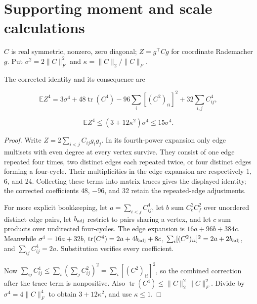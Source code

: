 \section{Supporting moment and scale calculations}\label{sec:technical}
\begin{lemma}\label{thm:T14}
$C$ is real symmetric, nonzero, zero diagonal; $Z=g^\top Cg$ for coordinate Rademacher $g$. Put $\sigma^2=2\|C\|_F^2$ and $\kappa=\|C\|_2/\|C\|_F$.


The corrected identity and its consequence are


\begin{equation}
\mathbb EZ^4=3\sigma^4+48\operatorname{tr}(C^4)
-96\sum_i[(C^2)_{ii}]^2+32\sum_{i,j}C_{ij}^4,
\end{equation}


\begin{equation}
\boxed{\mathbb EZ^4\le(3+12\kappa^2)\sigma^4\le15\sigma^4.}
\end{equation}


\end{lemma}
\begin{proof}
Write $Z=2\sum_{i<j}C_{ij}g_ig_j$. In its fourth-power expansion only edge multisets with even degree at every vertex survive. They consist of one edge repeated four times, two distinct edges each repeated twice, or four distinct edges forming a four-cycle. Their multiplicities in the edge expansion are respectively 1, 6, and 24. Collecting these terms into matrix traces gives the displayed identity; the corrected coefficients 48, $-96$, and 32 retain the repeated-edge adjustments.


For more explicit bookkeeping, let $a=\sum_{i<j}C_{ij}^4$, let $b$ sum $C_e^2C_f^2$ over unordered distinct edge pairs, let $b_{\rm adj}$ restrict to pairs sharing a vertex, and let $c$ sum products over undirected four-cycles. The edge expansion is $16a+96b+384c$. Meanwhile $\sigma^4=16a+32b$, $\operatorname{tr}(C^4)=2a+4b_{\rm adj}+8c$, $\sum_i[(C^2)_{ii}]^2=2a+2b_{\rm adj}$, and $\sum_{ij}C_{ij}^4=2a$. Substitution verifies every coefficient.


Now $\sum_{ij}C_{ij}^4\le\sum_i(\sum_jC_{ij}^2)^2=\sum_i[(C^2)_{ii}]^2$, so the combined correction after the trace term is nonpositive. Also $\operatorname{tr}(C^4)\le\|C\|_2^2\|C\|_F^2$. Divide by $\sigma^4=4\|C\|_F^4$ to obtain $3+12\kappa^2$, and use $\kappa\le1$.

\end{proof}


